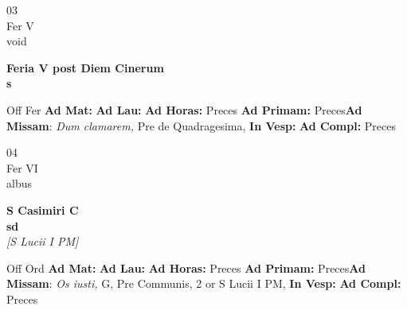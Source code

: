 \documentclass[10pt, openany]{book}
\begin{document}
    \begin{center}
        \begin{minipage}{3.5in}
            \vspace{2em}
            \begin{minipage}{0.5in}
                {\Huge 03} \\
                {\normalsize Fer V} \\
                {\normalsize void}
            \end{minipage}
            \begin{minipage}{3.0in}
                \textbf{ \large Feria V post Diem Cinerum \\
                \textnormal{\normalsize s}} \\ 
            \end{minipage}
            \begin{justify}Off Fer
                \textbf{Ad Mat: }
                \textbf{Ad Lau: }
                \textbf{Ad Horas: }Preces
                \textbf{Ad Primam: }Preces\textbf{Ad Missam}: \textit{Dum clamarem,} Pre de Quadragesima,  
                \textbf{In Vesp: }
                \textbf{Ad Compl: }Preces
            \end{justify}
        \end{minipage}
    \end{center}

    \begin{center}
        \begin{minipage}{3.5in}
            \vspace{2em}
            \begin{minipage}{0.5in}
                {\Huge 04} \\
                {\normalsize Fer VI} \\
                {\normalsize albus}
            \end{minipage}
            \begin{minipage}{3.0in}
                \textbf{ \large S Casimiri C \\
                \textnormal{\normalsize sd}} \\ \textit{[S Lucii I PM]} \\ 
            \end{minipage}
            \begin{justify}Off Ord
                \textbf{Ad Mat: }
                \textbf{Ad Lau: }
                \textbf{Ad Horas: }Preces
                \textbf{Ad Primam: }Preces\textbf{Ad Missam}: \textit{Os iusti,} G, Pre Communis, 2 or S Lucii I PM,  
                \textbf{In Vesp: }
                \textbf{Ad Compl: }Preces
            \end{justify}
        \end{minipage}
    \end{center}
\end{document}
